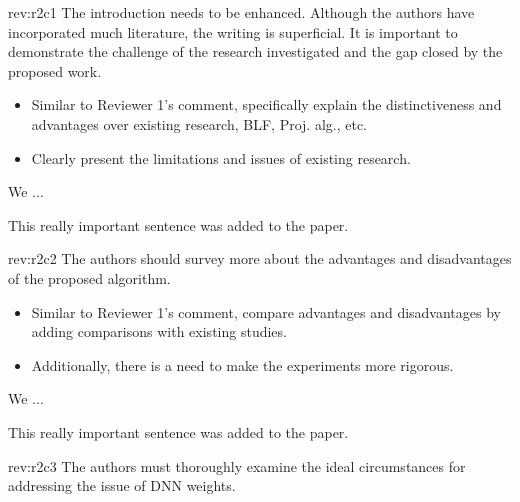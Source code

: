 \documentclass[12pt,english]{reviewresponse}
\begin{document}
\begin{revcomment}[1]{rev:r2c1}
    The introduction needs to be enhanced. Although the authors have incorporated much literature, the writing is superficial. It is important to demonstrate the challenge of the research investigated and the gap closed by the proposed work.
\end{revcomment}

\begin{howtoanswer}
    \begin{itemize}
        \item Similar to Reviewer 1's comment, specifically explain the distinctiveness and advantages over existing research, BLF, Proj. alg., etc.
        \item Clearly present the limitations and issues of existing research.
    \end{itemize}
\end{howtoanswer}

\begin{revresponse}
    We ...
    \begin{changes}
        This really important sentence was added to the paper.
    \end{changes}
\end{revresponse}

\begin{revcomment}[1]{rev:r2c2}
    The authors should survey more about the advantages and disadvantages of the proposed algorithm.
\end{revcomment}

\begin{howtoanswer}
    \begin{itemize}
        \item Similar to Reviewer 1's comment, compare advantages and disadvantages by adding comparisons with existing studies.
        \item Additionally, there is a need to make the experiments more rigorous.
    \end{itemize}
\end{howtoanswer}

\begin{revresponse}
    We ...
    \begin{changes}
        This really important sentence was added to the paper.
    \end{changes}
\end{revresponse}

\begin{revcomment}[2]{rev:r2c3}
    The authors must thoroughly examine the ideal circumstances for addressing the issue of DNN weights.
\end{revcomment}
\end{document}
